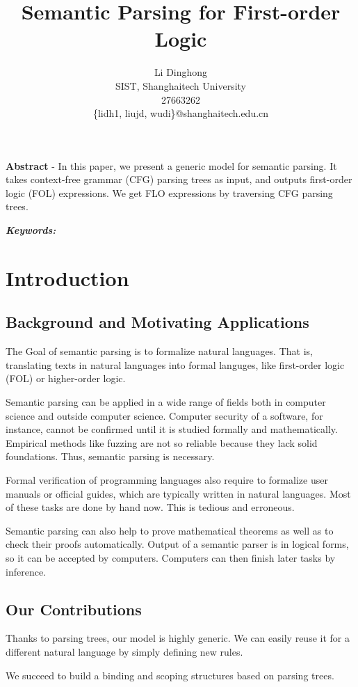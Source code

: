 \documentclass{article}
\title{Semantic Parsing for First-order Logic}
\author{
	Li Dinghong\\
	SIST, Shanghaitech University\\
	27663262\\
	\{lidh1, liujd, wudi\}@shanghaitech.edu.cn
}
\begin{document}
{
	\newpage
	\maketitle

	\textbf{Abstract} - {In this paper, we present a generic model for semantic parsing. It takes context-free grammar (CFG) parsing trees as input, and outputs first-order logic (FOL) expressions. We get FLO expressions by traversing CFG parsing trees. }

	\vspace{5pt}
	\textbf{\emph{Keywords:}} {}

	\tableofcontents
}

\section{Introduction}{
	\subsection{Background and Motivating Applications}{
		The Goal of semantic parsing is to formalize natural languages. That is, translating texts in natural languages into formal languges, like first-order logic (FOL) or higher-order logic. 





		Semantic parsing can be applied in a wide range of fields both in computer science and outside computer science. Computer security of a software, for instance, cannot be confirmed until it is studied formally and mathematically. Empirical methods like fuzzing are not so reliable because they lack solid foundations. Thus, semantic parsing is necessary. 

		Formal verification of programming languages also require to formalize user manuals or official guides, which are typically written in natural languages. Most of these tasks are done by hand now. This is tedious and erroneous. 

		Semantic parsing can also help to prove mathematical theorems as well as to check their proofs automatically. Output of a semantic parser is in logical forms, so it can be accepted by computers. Computers can then finish later tasks by inference. 
	}

	\subsection{Our Contributions}{
		Thanks to parsing trees, our model is highly generic. We can easily reuse it for a different natural language by simply defining new rules. 

		\cite{matsuzaki}

		We succeed to build a binding and scoping structures based on parsing trees. 
	}
}
\end{document}

